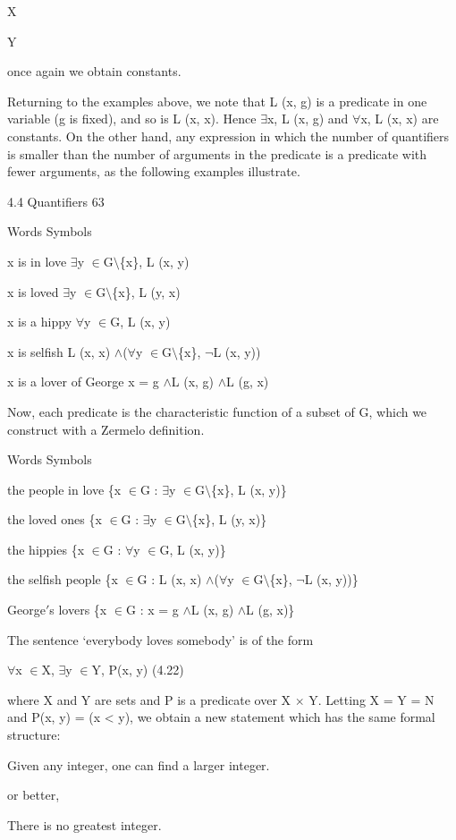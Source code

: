 \documentclass[11pt]{article}
\theoremstyle{plain}
\theoremstyle{definition}
\begin{document}
X

Y

once again we obtain constants.

Returning to the examples above, we note that L (x, g) is a predicate in one variable (g is fixed), and so is L (x, x). Hence $\exists$x, L (x, g) and $\forall$x, L (x, x) are constants. On the other hand, any expression in which the number of quantifiers is smaller than the number of arguments in the predicate is a predicate with fewer arguments, as the following examples illustrate.

4.4 Quantifiers 63

Words Symbols

x is in love $\exists$y $\in$G$\setminus$\{x\}, L (x, y)

x is loved $\exists$y $\in$G$\setminus$\{x\}, L (y, x)

x is a hippy $\forall$y $\in$G, L (x, y)

x is selfish L (x, x) $\land$($\forall$y $\in$G$\setminus$\{x\}, $\neg$L (x, y))

x is a lover of George x = g $\land$L (x, g) $\land$L (g, x)

Now, each predicate is the characteristic function of a subset of G, which we construct with a Zermelo definition.

Words Symbols

the people in love \{x $\in$G : $\exists$y $\in$G$\setminus$\{x\}, L (x, y)\}

the loved ones \{x $\in$G : $\exists$y $\in$G$\setminus$\{x\}, L (y, x)\}

the hippies \{x $\in$G : $\forall$y $\in$G, L (x, y)\}

the selfish people \{x $\in$G : L (x, x) $\land$($\forall$y $\in$G$\setminus$\{x\}, $\neg$L (x, y))\}

George$'$s lovers \{x $\in$G : x = g $\land$L (x, g) $\land$L (g, x)\}

The sentence `everybody loves somebody' is of the form

$\forall$x $\in$X, $\exists$y $\in$Y, P(x, y) (4.22)

where X and Y are sets and P is a predicate over X $\times$ Y. Letting X = Y = N and P(x, y) = (x < y), we obtain a new statement which has the same formal structure:

Given any integer, one can find a larger integer.

or better,

There is no greatest integer.
\end{document}
